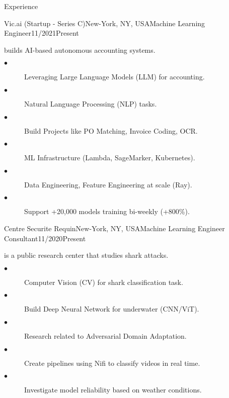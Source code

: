 \documentclass{resume}
\begin{document}
\begin{multicols}{2}
\begin{rSection}{\Large Experience}
		\begin{job}{Vic.ai (Startup - Series C)}{New-York, NY, USA}{Machine Learning Engineer}{11/2021}{Present}{
			builds AI-based autonomous accounting systems.
			\begin{description}
				\item[$\bullet$] Leveraging Large Language Models (LLM) for accounting.
				\item[$\bullet$] Natural Language Processing (NLP) tasks.
				\item[$\bullet$] Build Projects like PO Matching, Invoice Coding, OCR.
				\item[$\bullet$] ML Infrastructure (Lambda, SageMarker, Kubernetes).
				\item[$\bullet$] Data Engineering, Feature Engineering at scale (Ray).
				\item[$\bullet$] Support +20,000 models training bi-weekly (+800\%).
			\end{description}
		}
		\end{job}

		\begin{job}{Centre Securite Requin}{New-York, NY, USA}{Machine Learning Engineer Consultant}{11/2020}{Present}{
			is a public research center that studies shark attacks.
			\begin{description}
				\item[$\bullet$] Computer Vision (CV) for shark classification task.
				\item[$\bullet$] Build Deep Neural Network for underwater (CNN/ViT).
				\item[$\bullet$] Research related to Adversarial Domain Adaptation.
				\item[$\bullet$] Create pipelines using Nifi to classify videos in real time.
				\item[$\bullet$] Investigate model reliability based on weather conditions.
			\end{description}
		}
		\end{job}


\end{rSection}
\end{multicols}
\end{document}
